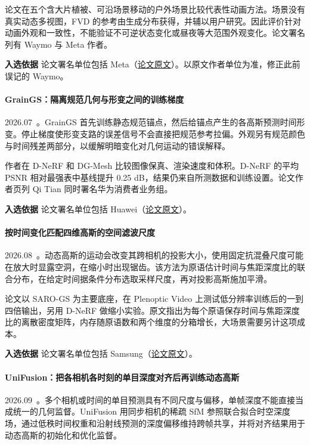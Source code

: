 论文在五个含大片植被、可沿场景移动的户外场景比较代表性动画方法。场景没有真实动态多视图，FVD 的参考由生成分布获得，并辅以用户研究。因此评价针对动画外观和一致性，不能验证不可逆状态变化或昼夜等大范围外观变化。论文署名列有 Waymo 与 Meta 作者。

\textbf{入选依据} 论文署名单位包括 Meta（\href{https://arxiv.org/html/2607.18539v1}{论文原文}）。以原文作者单位为准，修正此前误记的 Waymo。

\paragraph{GrainGS：隔离规范几何与形变之间的训练梯度}
2026.07~\cite{2607_21448}。GrainGS 首先训练静态规范锚点，然后给锚点产生的各高斯预测时间形变。停止梯度使形变支路的误差信号不会直接把规范参考拉偏。外观另有规范颜色与时间残差两部分，以缓解明暗变化对几何运动的错误解释。

作者在 D-NeRF 和 DG-Mesh 比较图像保真、渲染速度和体积。D-NeRF 的平均 PSNR 相对最强表中基线提升 0.25 dB，结果仍来自所测数据和训练设置。论文作者页列 Qi Tian 同时署名华为消费者业务组。

\textbf{入选依据} 论文署名单位包括 Huawei（\href{https://arxiv.org/html/2607.21448v1}{论文原文}）。

\paragraph{按时间变化匹配四维高斯的空间滤波尺度}
2026.08~\cite{2608_21828}。动态高斯的运动会改变其跨相机的投影大小，使用固定抗混叠尺度可能在放大时显露空洞，在缩小时出现锯齿。该方法为原语估计时间与焦距深度比的联合分布，在给定时间据条件分布选取采样尺度，再对投影高斯施加平滑。

论文以 SARO-GS 为主要底座，在 Plenoptic Video 上测试低分辨率训练后的一到四倍输出，另用 D-NeRF 做缩小实验。原文指出为每个原语保存时间与焦距深度比的离散密度矩阵，内存随原语数和两个维度的分箱增长，大场景需要另计这项成本。

\textbf{入选依据} 论文署名单位包括 Samsung（\href{https://arxiv.org/abs/2608.21828}{论文原文}）。

\paragraph{UniFusion：把各相机各时刻的单目深度对齐后再训练动态高斯}
2026.09~\cite{2609_05888}。多个相机或时间的单目预测具有不同尺度与偏移，单帧深度不能直接当成统一的几何监督。UniFusion 用同步相机的稀疏 SfM 参照联合拟合时空深度场，通过低秩时间权重和沿射线预测的深度偏移维持跨帧共享，并将对齐结果用于动态高斯的初始化和优化监督。

